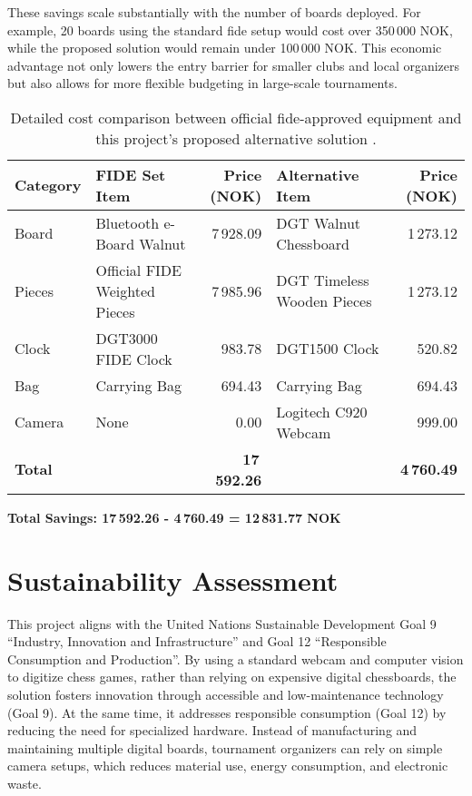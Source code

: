 These savings scale substantially with the number of boards deployed. For example, 20 boards using the standard \gls{fide} setup would cost over 350\,000 NOK, while the proposed solution would remain under 100\,000 NOK. This economic advantage not only lowers the entry barrier for smaller clubs and local organizers but also allows for more flexible budgeting in large-scale tournaments. \\

\begin{table}[h!]
\centering
\caption[Detailed cost comparison]{Detailed cost comparison between official \gls{fide}-approved equipment and this project's proposed alternative solution \cite{dgtshop:prices}.}
\label{tab:detailed-price-comparison}
\begin{tabular}{lL{4cm}rL{4cm}r}
\toprule
\textbf{Category} & \textbf{FIDE Set Item} & \textbf{Price (NOK)} & \textbf{Alternative Item} & \textbf{Price (NOK)} \\
\midrule
Board & Bluetooth e-Board Walnut & 7\,928.09 & DGT Walnut Chessboard & 1\,273.12 \\
Pieces & Official FIDE Weighted Pieces & 7\,985.96 & DGT Timeless Wooden Pieces & 1\,273.12 \\
Clock & DGT3000 FIDE Clock & 983.78 & DGT1500 Clock & 520.82 \\
Bag & Carrying Bag & 694.43 & Carrying Bag & 694.43 \\
Camera & None & 0.00 & Logitech C920 Webcam & 999.00 \\
\midrule
\textbf{Total} & & \textbf{17\,592.26} & & \textbf{4\,760.49} \\
\bottomrule
\end{tabular}
\vspace{0.3cm}

\textbf{Total Savings: 17\,592.26 - 4\,760.49 = 12\,831.77 NOK}
\end{table}

\section{Sustainability Assessment}
This project aligns with the United Nations Sustainable Development Goal 9 “Industry, Innovation and Infrastructure” and Goal 12 “Responsible Consumption and Production”. By using a standard webcam and computer vision to digitize chess games, rather than relying on expensive digital chessboards, the solution fosters innovation through accessible and low-maintenance technology (Goal 9). At the same time, it addresses responsible consumption (Goal 12) by reducing the need for specialized hardware. Instead of manufacturing and maintaining multiple digital boards, tournament organizers can rely on simple camera setups, which reduces material use, energy consumption, and electronic waste.

